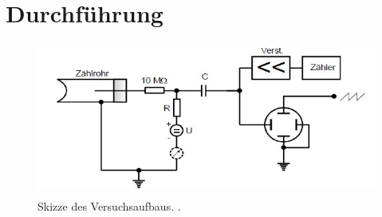 \section{Durchführung}
\label{sec:Durchführung}

\begin{figure}[H]
    \centering
    \includegraphics[height=5cm]{content/pics/aufbau.jpg}
    \caption{Skizze des Versuchsaufbaus. \cite{v703}.}
    \label{fig:aufbau}
\end{figure}
